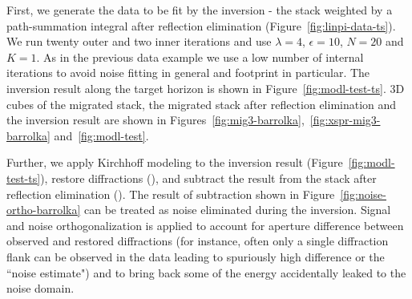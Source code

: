 
First, we generate the data to be fit by the inversion - the stack weighted by a path-summation integral after reflection elimination (Figure~\ref{fig:linpi-data-ts}).
We run twenty outer and two inner iterations and use $\lambda=4$, $\epsilon=10$, $N=20$ and $K=1$.
As in the previous data example we use a low number of internal iterations to avoid noise fitting in general and footprint in particular. The inversion result along the target horizon is shown 
in Figure~\ref{fig:modl-test-ts}.
3D cubes of the migrated stack, the
migrated stack after reflection elimination and the inversion result are shown in Figures~\ref{fig:mig3-barrolka},~\ref{fig:xspr-mig3-barrolka} and~\ref{fig:modl-test}.

Further, we apply Kirchhoff modeling to the inversion result (Figure~\ref{fig:modl-test-ts}), restore diffractions
(), and subtract the result from the stack after reflection elimination
(). The result
of subtraction shown in Figure~\ref{fig:noise-ortho-barrolka} can be treated as noise eliminated during the inversion. Signal and noise orthogonalization \cite[]{chen2015random}
is applied to account for aperture difference between observed and restored diffractions (for instance, often only a single diffraction flank can be observed in the data
leading to spuriously high difference or the ``noise estimate") and to bring back some of the energy accidentally leaked to the noise domain.

